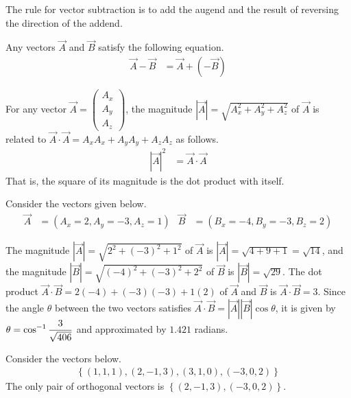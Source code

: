 \begin{answer}
	The rule for vector subtraction is to add the augend and the result of reversing the direction of the addend.

	Any vectors $\vec{A}$ and $\vec{B}$ satisfy the following equation.
	\begin{align}
		\vec{A} - \vec{B} & = \vec{A} + \left(-\vec{B}\right)
	\end{align}
\end{answer}

\begin{answer}
	For any vector $\vec{A} = \begin{pmatrix} A_x \\ A_y \\ A_z \end{pmatrix}$, the magnitude $\left| \vec{A} \right| = \sqrt{A_x^2 + A_y^2 + A_z^2}$ of $\vec{A}$ is related to $\vec{A} \cdot \vec{A} = A_x A_x + A_y A_y + A_z A_z$ as follows.
	\begin{align}
		\left| \overrightarrow{A} \right|^2 & = \overrightarrow{A} \cdot \overrightarrow{A}
	\end{align}
	That is, the square of its magnitude is the dot product with itself.
\end{answer}

\begin{answer}[Magnitudes]
	Consider the vectors given below.
	\begin{align}
		\vec{A} & = \left(A_x = 2, A_y = -3, A_z = 1\right)
		        &
		\vec{B} & = \left(B_x=-4, B_y=-3, B_z=2\right)
	\end{align}

	The magnitude $\left|\vec{A}\right| = \sqrt{2^2 + (-3)^2 + 1^2}$ of $\vec{A}$ is $\left|\vec{A}\right| = \sqrt{4+9+1} = \sqrt{14}$, and the magnitude $\left|\vec{B}\right| = \sqrt{(-4)^2 + (-3)^2 + 2^2}$ of $\vec{B}$ is $\left|\vec{B}\right| = \sqrt{29}$.
	The dot product $\vec{A} \cdot \vec{B} = 2(-4) + (-3)(-3) + 1(2)$ of $\vec{A}$ and $\vec{B}$ is $\vec{A} \cdot \vec{B} = 3$.
	Since the angle $\theta$ between the two vectors satisfies $\vec{A} \cdot \vec{B} = \left|\vec{A}\right| \left|\vec{B}\right| \cos \theta$, it is given by $\displaystyle \theta = \cos^{-1} \frac{3}{\sqrt{406}}$ and approximated by $1.421$ radians.
\end{answer}

\begin{answer}[Orthogonality]
	Consider the vectors below.
	\begin{align}
		\left\{(1,1,1), (2,-1,3), (3,1,0), (-3,0,2)\right\}
	\end{align}
	The only pair of orthogonal vectors is $\left\{(2,-1,3), (-3,0,2)\right\}$.
\end{answer}

